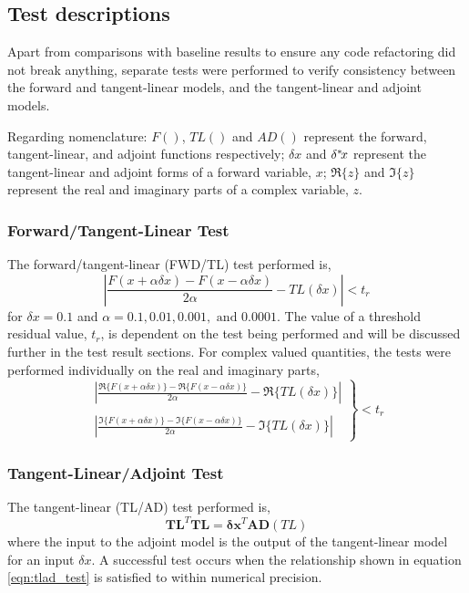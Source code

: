 \subsection{Test descriptions}
Apart from comparisons with baseline results to ensure any code refactoring did not break anything, separate tests were performed to verify consistency between the forward and tangent-linear models, and the tangent-linear and adjoint models. 

Regarding nomenclature: $F()$, $TL()$ and $AD()$ represent the forward, tangent-linear, and adjoint functions respectively; $\delta{x}$ and $\delta^{*}\!{x}$ represent the tangent-linear and adjoint forms of a forward variable, $x$; $\Re\{z\}$ and $\Im\{z\}$ represent the real and imaginary parts of a complex variable, $z$.

\subsubsection{Forward/Tangent-Linear Test}
\label{sec:fwdtl_test}
The forward/tangent-linear (FWD/TL) test performed is,
\begin{equation}
  \left|\frac{F(x+\alpha\delta{x}) - F(x-\alpha\delta{x})}{2\alpha} - TL(\delta{x})\right| < t_r
  \label{eqn:fwdtl_test}
\end{equation}
for $\delta{x} = 0.1$ and $\alpha = 0.1, 0.01, 0.001, \textrm{ and } 0.0001$. The value of a threshold residual value, $t_r$, is dependent on the test being performed and will be discussed further in the test result sections. For complex valued quantities, the tests were performed individually on the real and imaginary parts,
\begin{equation}
  \left. \begin{array}{l}
    \displaystyle\left|\frac{\Re\{F(x+\alpha\delta{x})\}-\Re\{F(x-\alpha\delta{x})\}}{2\alpha} - \Re\{TL(\delta{x})\}\right|\\\\
    \displaystyle\left|\frac{\Im\{F(x+\alpha\delta{x})\}-\Im\{F(x-\alpha\delta{x})\}}{2\alpha} - \Im\{TL(\delta{x})\}\right|
  \end{array} \right\} < t_r
  \label{eqn:complex_fwdtl_test}
\end{equation}


\subsubsection{Tangent-Linear/Adjoint Test}
\label{sec:tlad_test}
The tangent-linear (TL/AD) test performed is,
\begin{equation}
  \mathbf{TL}^{T}\mathbf{TL} = \mathbf{\delta x}^{T}\mathbf{AD}(TL)
  \label{eqn:tlad_test}
\end{equation}
where the input to the adjoint model is the output of the tangent-linear model for an input $\delta x$. A successful test occurs when the relationship shown in equation \ref{eqn:tlad_test} is satisfied to within numerical precision.

